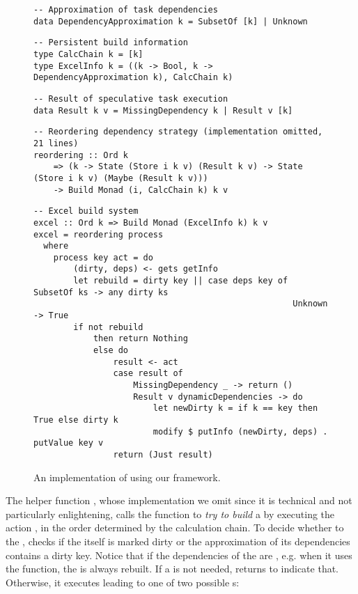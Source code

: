 \begin{figure}
\begin{verbatim}
-- Approximation of task dependencies
data DependencyApproximation k = SubsetOf [k] | Unknown
\end{verbatim}
\vspace{1mm}
\begin{verbatim}
-- Persistent build information
type CalcChain k = [k]
type ExcelInfo k = ((k -> Bool, k -> DependencyApproximation k), CalcChain k)
\end{verbatim}
\vspace{1mm}
\begin{verbatim}
-- Result of speculative task execution
data Result k v = MissingDependency k | Result v [k]
\end{verbatim}
\vspace{1mm}
\begin{verbatim}
-- Reordering dependency strategy (implementation omitted, 21 lines)
reordering :: Ord k
    => (k -> State (Store i k v) (Result k v) -> State (Store i k v) (Maybe (Result k v)))
    -> Build Monad (i, CalcChain k) k v
\end{verbatim}
\vspace{1mm}
\begin{verbatim}
-- Excel build system
excel :: Ord k => Build Monad (ExcelInfo k) k v
excel = reordering process
  where
    process key act = do
        (dirty, deps) <- gets getInfo
        let rebuild = dirty key || case deps key of SubsetOf ks -> any dirty ks
                                                    Unknown     -> True
        if not rebuild
            then return Nothing
            else do
                result <- act
                case result of
                    MissingDependency _ -> return ()
                    Result v dynamicDependencies -> do
                        let newDirty k = if k == key then True else dirty k
                        modify $ putInfo (newDirty, deps) . putValue key v
                return (Just result)
\end{verbatim}
\vspace{-2mm}
\caption{An implementation of \Excel using our framework.}\label{fig-excel-implementation}
\vspace{-2mm}
\end{figure}

The helper function , whose implementation we omit since it is
technical and not particularly enlightening, calls the function  to
\emph{try to build} a  by executing the action , in the order
determined by the calculation chain. To decide whether to  the
,  checks if the  itself is marked dirty or the
approximation of its dependencies contains a dirty key. Notice that if the
dependencies of the  are , e.g. when it uses the
 function, the  is always rebuilt. If a  is
not needed,  returns  to indicate that. Otherwise, it
executes  leading to one of two possible s:

